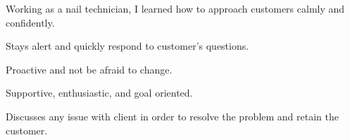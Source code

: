 

\begin{cventries}

  \cventry
    {} %
    {} %
    {} %
    {} %
    {
      \begin{cvitems} %
      \item 
      \item Working as a nail technician, I learned how to approach customers calmly and confidently.
      \item Stays alert and quickly respond to customer's questions.
      \item Proactive and not be afraid to change.
      \item Supportive, enthusiastic, and goal oriented.
      \item Discusses any issue with client in order to resolve the problem and retain the customer.
      \end{cvitems}
    }


\end{cventries}
